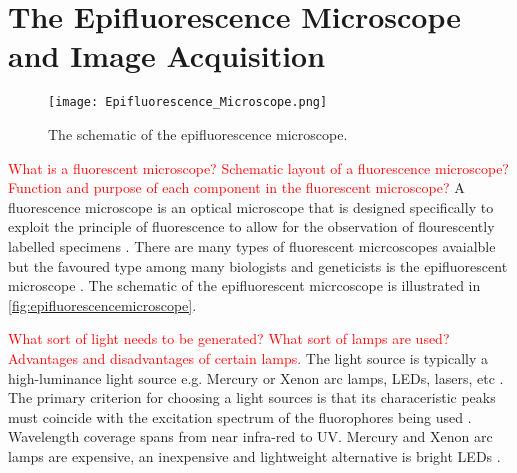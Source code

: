 
\section{The Epifluorescence Microscope and Image Acquisition}
\label{sec:TheEpifluorescenceMicroscope}

\begin{figure}[!t]
	\centering
	\texttt{[image: Epifluorescence\_Microscope.png]}
	\caption{The schematic of the epifluorescence microscope.}
	\label{fig:epifluorescencemicroscope}
\end{figure}

\textcolor{red}{What is a fluorescent microscope? Schematic layout of a fluorescence microscope? Function and purpose of each component in the fluorescent microscope?}
A fluorescence microscope is an optical microscope that is designed specifically to exploit the principle of fluorescence to allow for the observation of flourescently labelled specimens \citep{Hubeny2008,Sarder2006,Dobrucki2013,Andrews2002,Fatima2008}.
There are many types of fluorescent micrcoscopes avaialble but the favoured type among many biologists and geneticists is the epifluorescent microscope \citep{Rice2016}.
The schematic of the epifluorescent micrcoscope is illustrated in \autoref{fig:epifluorescencemicroscope}.


\begin{definition}
	\textcolor{red}{What sort of light needs to be generated? What sort of lamps are used? Advantages and disadvantages of certain lamps.}
	The light source is typically a high-luminance light source e.g. Mercury or Xenon arc lamps, LEDs, lasers, etc  \citep{Danek2012,Hubeny2008,Aswani2012,Rice2016,ThermoFisher2016}.
	The primary criterion for choosing a light sources is that its characeristic peaks must coincide with the excitation spectrum of the fluorophores being used \citep{LichtmanConchello2005,Spring2003,Fatima2008}.
	Wavelength coverage spans from near infra-red to UV. Mercury and Xenon arc lamps are expensive, an inexpensive and lightweight alternative is bright LEDs \citep{Fatima2008,Dobrucki2013,Aswani2012,Koch1972}.
\end{definition}

